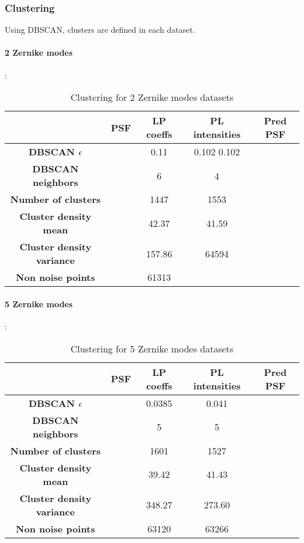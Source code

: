 	
	\subsubsection{Clustering}
		
		Using DBSCAN, clusters are defined in each dataset.
		
		\paragraph{2 Zernike modes}:
		\begin{table}[h!]
			\centering
			\begin{tabular}{|c|c|c|c|c|}
				\hline
				\textbf{} & \textbf{PSF} & \textbf{LP coeffs} & \textbf{PL intensities} & \textbf{Pred PSF}\\
				\hline
				\textbf{DBSCAN $\epsilon$} &  & 0.11 & 0.102 0.102 & \\
				\hline
				\textbf{DBSCAN neighbors} &  & 6 & 4 & \\
				\hline
				\textbf{Number of clusters} &  & 1447 & 1553 & \\
				\hline
				\textbf{Cluster density mean} &  & 42.37 & 41.59 & \\
				\hline
				\textbf{Cluster density variance} &  & 157.86 & 64594 & \\
				\hline
				\textbf{Non noise points} &  & 61313 & \\
				\hline
			\end{tabular}
		\caption{Clustering for 2 Zernike modes datasets}
		\end{table}
		
		\paragraph{5 Zernike modes}:
		\begin{table}[h!]
			\centering
			\begin{tabular}{|c|c|c|c|c|}
				\hline
				\textbf{} & \textbf{PSF} & \textbf{LP coeffs} & \textbf{PL intensities} & \textbf{Pred PSF}\\
				\hline
				\textbf{DBSCAN $\epsilon$} &  & 0.0385 & 0.041 & \\
				\hline
				\textbf{DBSCAN neighbors} &  & 5 & 5 & \\
				\hline
				\textbf{Number of clusters} &  & 1601 & 1527 & \\
				\hline
				\textbf{Cluster density mean} &  & 39.42 & 41.43 & \\
				\hline
				\textbf{Cluster density variance} &  & 348.27 & 273.60 & \\
				\hline
				\textbf{Non noise points} &  & 63120 & 63266 & \\
				\hline
			\end{tabular}
		\caption{Clustering for 5 Zernike modes datasets}
		\end{table}
		
